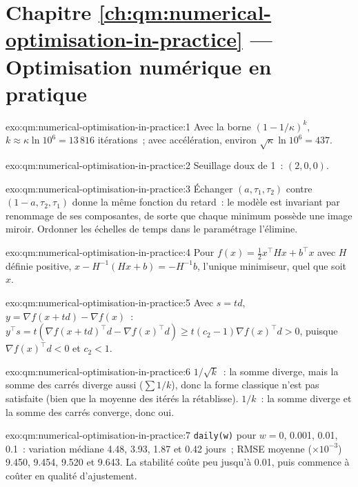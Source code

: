 \section*{Chapitre \ref{ch:qm:numerical-optimisation-in-practice} --- Optimisation numérique en pratique}

\begin{solution}{exo:qm:numerical-optimisation-in-practice:1}
Avec la borne $(1 - 1/\kappa)^k$, $k \approx \kappa\ln10^6 = 13\,816$ itérations~; avec accélération, environ $\sqrt\kappa\ln10^6 = 437$.
\end{solution}

\begin{solution}{exo:qm:numerical-optimisation-in-practice:2}
Seuillage doux de 1~: $(2, 0, 0)$.
\end{solution}

\begin{solution}{exo:qm:numerical-optimisation-in-practice:3}
Échanger $(a, \tau_1, \tau_2)$ contre $(1 - a, \tau_2, \tau_1)$ donne la même fonction du retard~: le modèle est invariant par renommage de ses composantes, de sorte que chaque minimum possède une image miroir.
Ordonner les échelles de temps dans le paramétrage l'élimine.
\end{solution}

\begin{solution}{exo:qm:numerical-optimisation-in-practice:4}
Pour $f(x) = \frac12x^\top Hx + b^\top x$ avec $H$ définie positive, $x - H^{-1}(Hx + b) = -H^{-1}b$, l'unique minimiseur, quel que soit $x$.
\end{solution}

\begin{solution}{exo:qm:numerical-optimisation-in-practice:5}
Avec $s = td$, $y = \nabla f(x + td) - \nabla f(x)$~: $y^\top s = t(\nabla f(x + td)^\top d - \nabla f(x)^\top d) \ge t(c_2 - 1)\nabla f(x)^\top d > 0$, puisque $\nabla f(x)^\top d < 0$ et $c_2 < 1$.
\end{solution}

\begin{solution}{exo:qm:numerical-optimisation-in-practice:6}
$1/\sqrt k$~: la somme diverge, mais la somme des carrés diverge aussi ($\sum1/k$), donc la forme classique n'est pas satisfaite (bien que la moyenne des itérés la rétablisse). $1/k$~: la somme diverge et la somme des carrés
converge, donc oui.
\end{solution}

\begin{solution}{exo:qm:numerical-optimisation-in-practice:7}
\texttt{daily(w)} pour $w = 0$, 0.001, 0.01, 0.1~: variation médiane 4.48, 3.93, 1.87 et 0.42 jours~; RMSE moyenne ($\times 10^{-3}$) 9.450, 9.454, 9.520 et 9.643. La stabilité coûte peu jusqu'à 0.01, puis commence à
coûter en qualité d'ajustement.
\end{solution}

